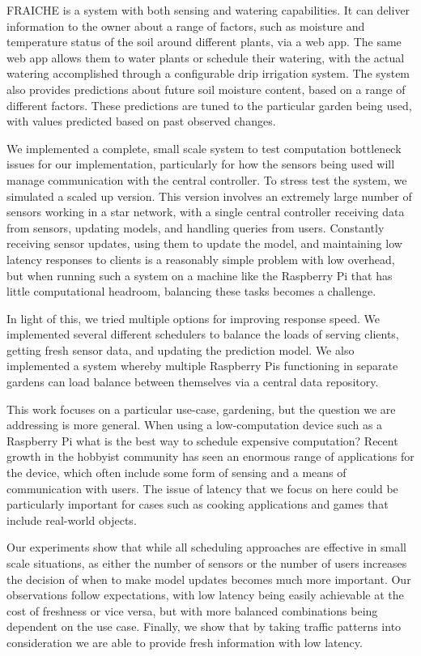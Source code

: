 \documentclass[a4paper]{acm_proc_article-sp}
\begin{document}
FRAICHE is a system with both sensing and watering capabilities. It can deliver information to the owner about a range of factors, such as moisture and temperature status of the soil around different plants, via a web app. The same web app allows them to water plants or schedule their watering, with the actual watering accomplished through a configurable drip irrigation system. The system also provides predictions about future soil moisture content, based on a range of different factors. These predictions are tuned to the particular garden being used, with values predicted based on past observed changes.

We implemented a complete, small scale system to test computation bottleneck issues for our implementation, particularly for how the sensors being used will manage communication with the central controller. To stress test the system, we simulated a scaled up version. This version involves an extremely large number of sensors working in a star network, with a single central controller receiving data from sensors, updating models, and handling queries from users.  Constantly receiving sensor updates, using them to update the model, and maintaining low latency responses to clients is a reasonably simple problem with low overhead, but when running such a system on a machine like the Raspberry Pi that has little computational headroom, balancing these tasks becomes a challenge.

In light of this, we tried multiple options for improving response speed.  We implemented several different schedulers to balance the loads of serving clients, getting fresh sensor data, and updating the prediction model.  We also implemented a system whereby multiple Raspberry Pis functioning in separate gardens can load balance between themselves via a central data repository.

This work focuses on a particular use-case, gardening, but the question we are addressing is more general.  When using a low-computation device such as a Raspberry Pi what is the best way to schedule expensive computation?  Recent growth in the hobbyist community has seen an enormous range of applications for the device, which often include some form of sensing and a means of communication with users.  The issue of latency that we focus on here could be particularly important for cases such as cooking applications and games that include real-world objects.

Our experiments show that while all scheduling approaches are effective in small scale situations, as either the number of sensors or the number of users increases the decision of when to make model updates becomes much more important.  Our observations follow expectations, with low latency being easily achievable at the cost of freshness or vice versa, but with more balanced combinations being dependent on the use case.  Finally, we show that by taking traffic patterns into consideration we are able to provide fresh information with low latency.
\end{document}
